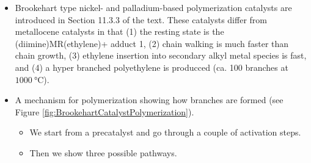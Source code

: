 \documentclass[../notes.tex]{subfiles}
\begin{document}
\begin{itemize}
\begin{figure}[h!]
            [-90]
            [180,2.2]
            [180,1.4]
            [90,1.9]
        \schemestop
        \caption{Wacker oxidation mechanism (for an alcohol).}
        \label{fig:mechanism-WackerOxidationAlcohol}
    \end{figure}
    \begin{itemize}
        \item Look back at the traditional mechanism but be aware of such derivatives. Know the similarities. The starting material should drive you toward the product.
        \item Does it matter when the ligands are being lost and coordinated.
        \begin{itemize}
            \item Not really.
            \item Anderson's way is probably a bit more realistic.
        \end{itemize}
    \end{itemize}
    \item Brookehart type nickel- and palladium-based polymerization catalysts are introduced in Section 11.3.3 of the text. These catalysts differ from metallocene catalysts in that (1) the resting state is the (diimine)MR(ethylene)+ adduct 1, (2) chain walking is much faster than chain growth, (3) ethylene insertion into secondary alkyl metal species is fast, and (4) a hyper branched polyethylene is producced (ca. 100 branches at $\SI{1000}{\celsius}$).
    \item A mechanism for polymerization showing how branches are formed (see Figure \ref{fig:BrookehartCatalystPolymerization}).
    \begin{itemize}
        \item We start from a precatalyst and go through a couple of activation steps.
        \item Then we show three possible pathways.
        \begin{itemize}

\end{itemize}
\end{itemize}
\end{itemize}
\end{document}
